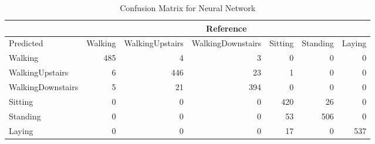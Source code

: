 \begin{table}[ht]
\centering
\caption{Confusion Matrix for Neural Network} 
\label{tab:conmat_nnet}
\begin{tabular}{l|rrrrrr}
  &\multicolumn{6}{c}{Reference}\\
 \hline
Predicted & Walking & WalkingUpstairs & WalkingDownstairs & Sitting & Standing & Laying \\ 
  \hline
Walking & 485 &   4 &   3 &   0 &   0 &   0 \\ 
  WalkingUpstairs &   6 & 446 &  23 &   1 &   0 &   0 \\ 
  WalkingDownstairs &   5 &  21 & 394 &   0 &   0 &   0 \\ 
  Sitting &   0 &   0 &   0 & 420 &  26 &   0 \\ 
  Standing &   0 &   0 &   0 &  53 & 506 &   0 \\ 
  Laying &   0 &   0 &   0 &  17 &   0 & 537 \\ 
   \hline
\end{tabular}
\end{table}
